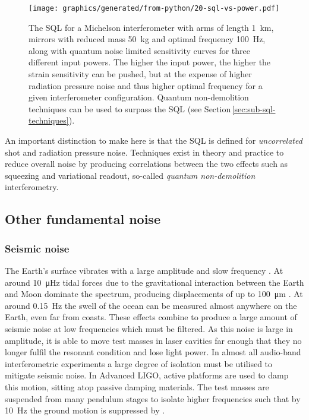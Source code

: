 \begin{figure}
  \centering
  \texttt{[image: graphics/generated/from-python/20-sql-vs-power.pdf]}
  \caption[Standard quantum limit and the quantum noise with various input powers]{\label{fig:sql-vs-input-power}The \gls{SQL} for a Michelson interferometer with arms of length \SI{1}{\kilo\meter}, mirrors with reduced mass \SI{50}{\kilo\gram} and optimal frequency \SI{100}{\hertz}, along with quantum noise limited sensitivity curves for three different input powers. The higher the input power, the higher the strain sensitivity can be pushed, but at the expense of higher radiation pressure noise and thus higher optimal frequency for a given interferometer configuration. Quantum non-demolition techniques can be used to surpass the \gls{SQL} (see Section\,\ref{sec:sub-sql-techniques}).}
\end{figure}

An important distinction to make here is that the \gls{SQL} is defined for \emph{uncorrelated} shot and radiation pressure noise. Techniques exist in theory and practice to reduce overall noise by producing correlations between the two effects such as squeezing and variational readout, so-called \emph{quantum non-demolition} interferometry. 

\subsection{Other fundamental noise}

\subsubsection{Seismic noise}
The Earth's surface vibrates with a large amplitude and slow frequency \cite{ET2011}. At around \SI{10}{\micro\hertz} tidal forces due to the gravitational interaction between the Earth and Moon dominate the spectrum, producing displacements of up to \SI{100}{\micro\meter} \cite{Adhikari2004}. At around \SI{0.15}{\hertz} the swell of the ocean can be measured almost anywhere on the Earth, even far from coasts. These effects combine to produce a large amount of seismic noise at low frequencies which must be filtered. As this noise is large in amplitude, it is able to move test masses in laser cavities far enough that they no longer fulfil the resonant condition and lose light power. In almost all audio-band interferometric experiments a large degree of isolation must be utilised to mitigate seismic noise. In Advanced \gls{LIGO}, active platforms are used to damp this motion, sitting atop passive damping materials. The test masses are suspended from many pendulum stages to isolate higher frequencies such that by \SI{10}{\hertz} the ground motion is suppressed by .

